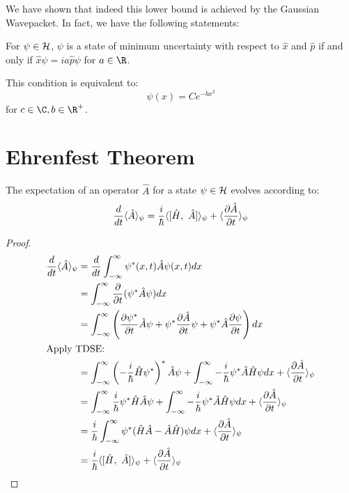 \documentclass[../Main.tex]{subfiles}
\begin{document}
We have shown that indeed this lower bound is achieved by the Gaussian Wavepacket. In fact, we have the following statements:
\begin{proposition}
    For $\psi \in \mathcal{H}$, $\psi$ is a state of minimum uncertainty with respect to $\hat{x}$ and $\hat{p}$ if and only if $\hat{x} \psi = i a \hat{p} \psi$ for $a \in \R$.

    This condition is equivalent to:
    \begin{equation*}
        \psi(x) = C e^{-b x^2}
    \end{equation*}
    for $c \in \C, b \in \R^+$.
    \label{propMinUncConditions}
\end{proposition}
\section{Ehrenfest Theorem}
\begin{theorem}
    The expectation of an operator $\hat{A}$ for a state $\psi \in \mathcal{H}$ evolves according to:
    \begin{equation}
        \frac{d}{dt} \langle \hat{A} \rangle_\psi = \frac{i}{\hbar} \langle [\hat{H},~\hat{A}] \rangle_\psi + \langle \frac{\partial \hat{A}}{\partial t} \rangle_\psi
        \label{eqnEhrenfest}
    \end{equation}
    \label{thmEhrenfest}
\end{theorem}
\begin{proof}
    \begin{align*}
        \frac{d}{dt} \langle \hat{A} \rangle_\psi &= \frac{d}{dt}\int_{-\infty}^{\infty} \psi^*(x, t) \hat{A} \psi(x, t) dx \\
        &= \int_{-\infty}^{\infty} \frac{\partial}{\partial t} (\psi^* \hat{A} \psi) dx \\
        &= \int_{-\infty}^{\infty} \left(\frac{\partial \psi^*}{\partial t} \hat{A} \psi + \psi^* \frac{\partial \hat{A}}{\partial t}\psi + \psi^* \hat{A} \frac{\partial \psi}{\partial t}\right) dx \\
        \intertext{Apply TDSE:}
        &=\int_{-\infty}^\infty \left(-\frac{i}{\hbar}\hat{H}\psi^*\right)^*\hat{A}\psi + \int_{-\infty}^{\infty} -\frac{i}{\hbar}\psi^* \hat{A}\hat{H}\psi dx + \langle \frac{\partial \hat{A}}{\partial t} \rangle_\psi\\
        &=\int_{-\infty}^\infty \frac{i}{\hbar}\psi^*\hat{H}\hat{A}\psi + \int_{-\infty}^{\infty} -\frac{i}{\hbar}\psi^* \hat{A}\hat{H}\psi dx + \langle \frac{\partial \hat{A}}{\partial t} \rangle_\psi\\
        &= \frac{i}{\hbar} \int_{-\infty}^{\infty} \psi^* (\hat{H} \hat{A} - \hat{A} \hat{H})\psi dx + \langle \frac{\partial \hat{A}}{\partial t} \rangle_\psi \\
        &= \frac{i}{\hbar} \langle [\hat{H},~\hat{A}] \rangle_\psi + \langle \frac{\partial \hat{A}}{\partial t} \rangle_\psi
    \end{align*}
\end{proof}
\end{document}
